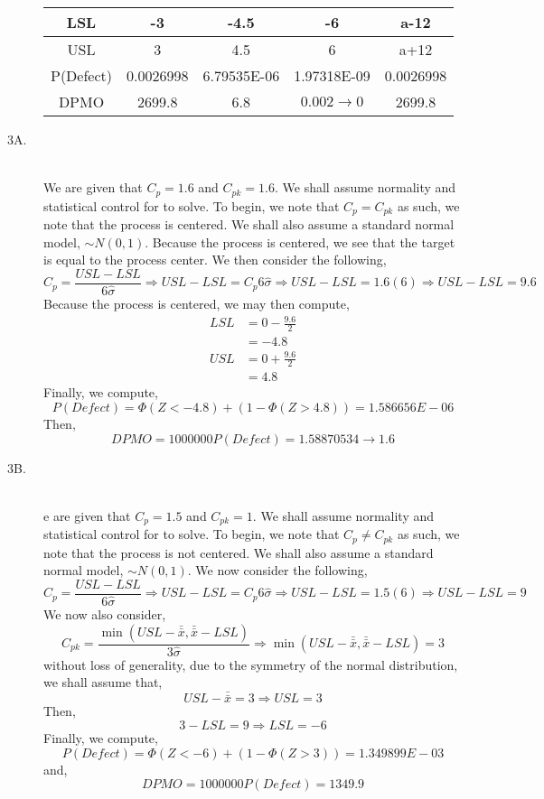 \documentclass[letterpaper,10pt]{article}
\begin{document}
\begin{description}
\begin{center}
\begin{tabular}{|c|c|c|c|c|}
LSL & -3 & -4.5 & -6 & a-12\\\hline
USL & 3 & 4.5 & 6 & a+12\\\hline
\cellcolor{yellow!25}P(Defect) & \cellcolor{yellow!25}0.0026998 & \cellcolor{yellow!25}6.79535E-06 & \cellcolor{yellow!25}1.97318E-09 & \cellcolor{yellow!25}0.0026998\\\hline
\cellcolor{yellow!25}DPMO & \cellcolor{yellow!25}2699.8 & \cellcolor{yellow!25}6.8 & \cellcolor{yellow!25}$0.002\to 0$ & \cellcolor{yellow!25}2699.8\\\hline
\end{tabular}
\end{center}
\item[3A.]\hfill\\
We are given that $C_p=1.6$ and $C_{pk}=1.6$. We shall assume normality and statistical control for to solve. To begin, we note that $C_p=C_{pk}$ as such, we note that the process is centered. We shall also assume a standard normal model, $\sim N(0,1)$. Because the process is centered, we see that the target is equal to the process center. We then consider the following,
\[C_p=\frac{USL-LSL}{6\hat{\sigma}}\Rightarrow USL-LSL=C_p6\hat{\sigma}\Rightarrow USL-LSL=1.6(6)\Rightarrow USL-LSL=9.6\]
Because the process is centered, we may then compute,
\begin{align*}
LSL&=0-\frac{9.6}{2}\\
&=-4.8\\
USL&=0+\frac{9.6}{2}\\
&=4.8
\end{align*}
Finally, we compute,
\[P(Defect)=\Phi(Z<-4.8)+(1-\Phi(Z>4.8))=1.586656E-06\]
Then,
\[DPMO=1000000P(Defect)=1.58870534\to 1.6\]
\item[3B.]\hfill\\
e are given that $C_p=1.5$ and $C_{pk}=1$. We shall assume normality and statistical control for to solve. To begin, we note that $C_p\neq C_{pk}$ as such, we note that the process is not centered. We shall also assume a standard normal model, $\sim N(0,1)$. We now consider the following,
\[C_p=\frac{USL-LSL}{6\hat{\sigma}}\Rightarrow USL-LSL=C_p6\hat{\sigma}\Rightarrow USL-LSL=1.5(6)\Rightarrow USL-LSL=9\]
We now also consider,
\[C_{pk}=\frac{\min(USL-\bar{\bar{x}},\bar{\bar{x}}-LSL)}{3\hat{\sigma}}\Rightarrow \min(USL-\bar{\bar{x}},\bar{\bar{x}}-LSL)=3\]
without loss of generality, due to the symmetry of the normal distribution, we shall assume that,
\[USL-\bar{\bar{x}}=3\Rightarrow USL=3\]
Then,
\[3-LSL=9\Rightarrow LSL=-6\]
Finally, we compute,
\[P(Defect)=\Phi(Z<-6)+(1-\Phi(Z>3))=1.349899E-03\]
and,
\[DPMO=1000000P(Defect)=1349.9\]
\end{description}
\end{document}
